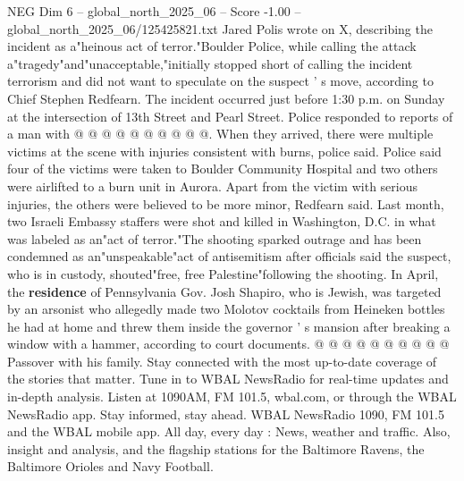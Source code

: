 \begin{textsample}{NEG Dim 6 – global\_north\_2025\_06 – Score -1.00 – global\_north\_2025\_06/125425821.txt}
Jared Polis wrote on X, describing the incident as a"heinous act of terror."Boulder Police, while calling the attack a"tragedy"and"unacceptable,"initially stopped short of calling the incident terrorism and did not want to speculate on the suspect ' s move, according to Chief Stephen Redfearn.
The incident occurred just before 1:30 p.m. on Sunday at the intersection of 13th Street and Pearl Street.
Police responded to reports of a man with @ @ @ @ @ @ @ @ @ @.
When they arrived, there were multiple victims at the scene with injuries consistent with burns, police said.
Police said four of the victims were taken to Boulder Community Hospital and two others were airlifted to a burn unit in Aurora.
Apart from the victim with serious injuries, the others were believed to be more minor, Redfearn said.
Last month, two Israeli Embassy staffers were shot and killed in Washington, D.C. in what was labeled as an"act of terror."The shooting sparked outrage and has been condemned as an"unspeakable"act of antisemitism after officials said the suspect, who is in custody, shouted"free, free Palestine"following the shooting.
In April, the \textbf{residence} of Pennsylvania Gov.
Josh Shapiro, who is Jewish, was targeted by an arsonist who allegedly made two Molotov cocktails from Heineken bottles he had at home and threw them inside the governor ' s mansion after breaking a window with a hammer, according to court documents. @ @ @ @ @ @ @ @ @ @ Passover with his family.
Stay connected with the most up-to-date coverage of the stories that matter.
Tune in to WBAL NewsRadio for real-time updates and in-depth analysis.
Listen at 1090AM, FM 101.5, wbal.com, or through the WBAL NewsRadio app.
Stay informed, stay ahead.
WBAL NewsRadio 1090, FM 101.5 and the WBAL mobile app.
All day, every day : News, weather and traffic.
Also, insight and analysis, and the flagship stations for the Baltimore Ravens, the Baltimore Orioles and Navy Football.

\end{textsample}
